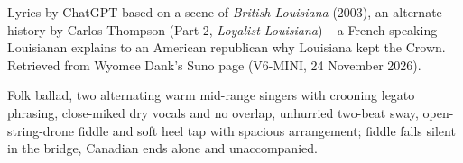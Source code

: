 
\begin{notes}
Lyrics by ChatGPT based on a scene of \emph{British Louisiana} (2003), an alternate history by Carlos Thompson (Part 2, \emph{Loyalist Louisiana}) -- a French-speaking Louisianan explains to an American republican why Louisiana kept the Crown. Retrieved from Wyomee Dank's Suno page (V6-MINI, 24 November 2026).
\end{notes}
\begin{style}
Folk ballad, two alternating warm mid-range singers with crooning legato phrasing, close-miked dry vocals and no overlap, unhurried two-beat sway, open-string-drone fiddle and soft heel tap with spacious arrangement; fiddle falls silent in the bridge, Canadian ends alone and unaccompanied.
\end{style}
